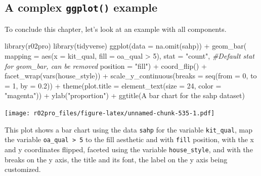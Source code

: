 \documentclass[
]{book}
\newenvironment{Shaded}{\begin{snugshade}}{\end{snugshade}}
\newcommand{\AttributeTok}[1]{\textcolor[rgb]{0.77,0.63,0.00}{#1}}
\newcommand{\CommentTok}[1]{\textcolor[rgb]{0.56,0.35,0.01}{\textit{#1}}}
\newcommand{\DecValTok}[1]{\textcolor[rgb]{0.00,0.00,0.81}{#1}}
\newcommand{\FloatTok}[1]{\textcolor[rgb]{0.00,0.00,0.81}{#1}}
\newcommand{\FunctionTok}[1]{\textcolor[rgb]{0.00,0.00,0.00}{#1}}
\newcommand{\NormalTok}[1]{#1}
\newcommand{\SpecialCharTok}[1]{\textcolor[rgb]{0.00,0.00,0.00}{#1}}
\newcommand{\StringTok}[1]{\textcolor[rgb]{0.31,0.60,0.02}{#1}}
\begin{document}
\hypertarget{a-complex-ggplot-example}{%
\subsection{\texorpdfstring{A complex \texttt{ggplot()} example}{A complex ggplot() example}}\label{a-complex-ggplot-example}}

To conclude this chapter, let's look at an example with all components.

\begin{Shaded}
\begin{Highlighting}[]
\FunctionTok{library}\NormalTok{(r02pro)}
\FunctionTok{library}\NormalTok{(tidyverse)}
\FunctionTok{ggplot}\NormalTok{(}\AttributeTok{data =} \FunctionTok{na.omit}\NormalTok{(sahp)) }\SpecialCharTok{+}
  \FunctionTok{geom\_bar}\NormalTok{(}
    \AttributeTok{mapping =} \FunctionTok{aes}\NormalTok{(}\AttributeTok{x =}\NormalTok{ kit\_qual, }\AttributeTok{fill =}\NormalTok{ oa\_qual }\SpecialCharTok{\textgreater{}} \DecValTok{5}\NormalTok{),}
    \AttributeTok{stat =} \StringTok{"count"}\NormalTok{, }\CommentTok{\#Default stat for geom\_bar, can be removed}
    \AttributeTok{position =} \StringTok{"fill"}\NormalTok{) }\SpecialCharTok{+}
  \FunctionTok{coord\_flip}\NormalTok{() }\SpecialCharTok{+}
  \FunctionTok{facet\_wrap}\NormalTok{(}\FunctionTok{vars}\NormalTok{(house\_style)) }\SpecialCharTok{+}
  \FunctionTok{scale\_y\_continuous}\NormalTok{(}\AttributeTok{breaks =} \FunctionTok{seq}\NormalTok{(}\AttributeTok{from =} \DecValTok{0}\NormalTok{, }\AttributeTok{to =} \DecValTok{1}\NormalTok{, }\AttributeTok{by =} \FloatTok{0.2}\NormalTok{)) }\SpecialCharTok{+}
  \FunctionTok{theme}\NormalTok{(}\AttributeTok{plot.title =} \FunctionTok{element\_text}\NormalTok{(}\AttributeTok{size =} \DecValTok{24}\NormalTok{, }\AttributeTok{color =} \StringTok{"magenta"}\NormalTok{)) }\SpecialCharTok{+}
  \FunctionTok{ylab}\NormalTok{(}\StringTok{"proportion"}\NormalTok{) }\SpecialCharTok{+}
  \FunctionTok{ggtitle}\NormalTok{(}\StringTok{\textquotesingle{}A bar chart for the sahp dataset\textquotesingle{}}\NormalTok{)}
\end{Highlighting}
\end{Shaded}

\texttt{[image: r02pro\_files/figure-latex/unnamed-chunk-535-1.pdf]}

This plot shows a bar chart using the data \texttt{sahp} for the variable \texttt{kit\_qual}, map the variable \texttt{oa\_qual\ \textgreater{}\ 5} to the fill aesthetic and with \texttt{fill} position, with the x and y coordinates flipped, faceted using the variable \texttt{house\_style}, and with the breaks on the y axis, the title and its font, the label on the y axis being customized.
\end{document}
